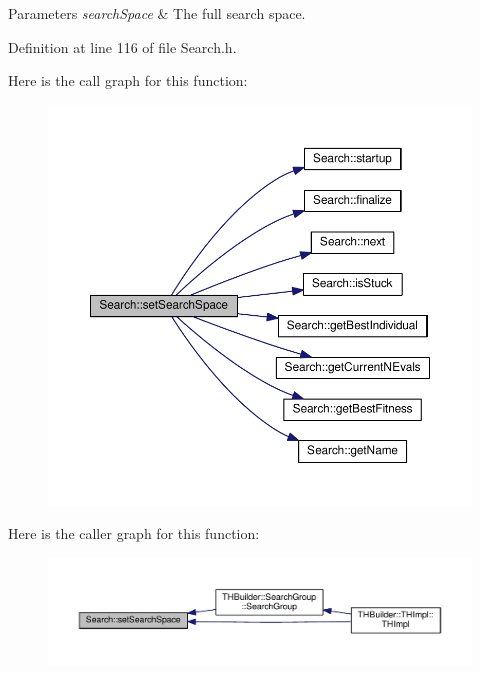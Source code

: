 \begin{DoxyParams}{Parameters}
{\em search\+Space} & The full search space. \\
\hline
\end{DoxyParams}


Definition at line 116 of file Search.\+h.



Here is the call graph for this function\+:
\nopagebreak
\begin{figure}[H]
\begin{center}
\leavevmode
\includegraphics[width=350pt]{classSearch_af9f46406f1f1f7f89ab294c155738ca6_cgraph}
\end{center}
\end{figure}




Here is the caller graph for this function\+:
\nopagebreak
\begin{figure}[H]
\begin{center}
\leavevmode
\includegraphics[width=350pt]{classSearch_af9f46406f1f1f7f89ab294c155738ca6_icgraph}
\end{center}
\end{figure}



